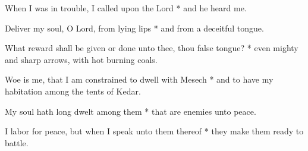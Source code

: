 When I was in trouble, I called upon the Lord * and he heard me.

Deliver my soul, O Lord, from lying lips * and from a deceitful tongue.

What reward shall be given or done unto thee, thou false tongue? * even mighty and sharp arrows, with hot burning coals.

Woe is me, that I am constrained to dwell with Mesech * and to have my habitation among the tents of Kedar.

My soul hath long dwelt among them * that are enemies unto peace.

I labor for peace, but when I speak unto them thereof * they make them ready to battle.